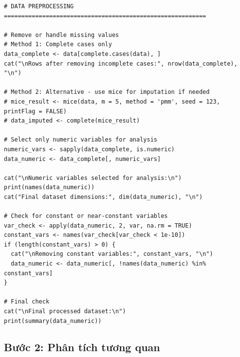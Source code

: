 \begin{lstlisting}[style=Rstyle, caption={Đọc dữ liệu vào để tiến hành phân tích dữ liệu}]
# DATA PREPROCESSING ==========================================================

# Remove or handle missing values
# Method 1: Complete cases only
data_complete <- data[complete.cases(data), ]
cat("\nRows after removing incomplete cases:", nrow(data_complete), "\n")

# Method 2: Alternative - use mice for imputation if needed
# mice_result <- mice(data, m = 5, method = 'pmm', seed = 123, printFlag = FALSE)
# data_imputed <- complete(mice_result)

# Select only numeric variables for analysis
numeric_vars <- sapply(data_complete, is.numeric)
data_numeric <- data_complete[, numeric_vars]

cat("\nNumeric variables selected for analysis:\n")
print(names(data_numeric))
cat("Final dataset dimensions:", dim(data_numeric), "\n")

# Check for constant or near-constant variables
var_check <- apply(data_numeric, 2, var, na.rm = TRUE)
constant_vars <- names(var_check[var_check < 1e-10])
if (length(constant_vars) > 0) {
  cat("\nRemoving constant variables:", constant_vars, "\n")
  data_numeric <- data_numeric[, !names(data_numeric) %in% constant_vars]
}

# Final check
cat("\nFinal processed dataset:\n")
print(summary(data_numeric))
\end{lstlisting}

\subsection{Bước 2: Phân tích tương quan}


